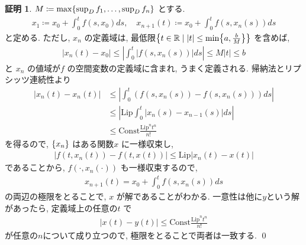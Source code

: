 \documentclass[10pt, fleqn, label-section=none]{bxjsarticle}
\theoremstyle{definition}
\newtheorem*{pf*}{証明}
\newcommand{\cbra}[1]{\mleft\{#1\mright\}}
\newcommand{\abs}[1]{\left|#1\right|}
\newcommand{\Const}{\textrm{Const}}
\renewcommand{\;}{\, ; \,}
\begin{document}
\begin{pf*} $M \coloneqq \max \cbra{ \sup_D f_1, \ldots , \sup_D f_n}$ とする.
\begin{align*} x_1 \coloneqq x_0 + \int_0^t f(s, x_0) ds , \quad x_{n+1} (t) \coloneqq x_0 + \int_0^t f(s, x_n (s) ) ds\end{align*}
と定める. ただし, $x_n$ の定義域は, 最低限$\cbra{ t \in \mathbb R \mid \abs{t} \leq \min \cbra{a, \frac{b}{M }} } $ を含めば, 
\begin{align*} \abs{x_n (t) - x_0}  \leq \abs{\int_0^t  \abs{f(s, x_n(s)) } ds } \leq M \abs t  \leq b \end{align*}
と
$x_n $ の値域が$f$ の空間変数の定義域に含まれ, うまく定義される.   帰納法とリプシッツ連続性より
\begin{align*} \abs{x_n(t) - x_n (t)} &\leq \abs{\int_0^t (f(s, x_n (s)) - f(s, x_n (s) ) )  ds} \\& \leq  \abs{ \textrm{Lip} \int_0^t \abs{x_n (s) - x_{n-1}(s) } ds } \\&\leq \Const \frac{\textrm{Lip} ^n t^n} {n!}   \end{align*}
を得るので, $\cbra{x_n}$ はある関数$x$ に一様収束し, 
\begin{align*} \abs{f(t, x_n (t)) - f(t,x(t))} \leq \textrm{Lip} \abs{x_n(t) - x(t)} \end{align*}
であることから, $f(\cdot, x_n(\cdot))$ も一様収束するので, 
\begin{align*}  x_{n+1} (t) = x_0 + \int_0^t f(s, x_n (s) ) ds \end{align*}
の両辺の極限をとることで, $x$ が解であることがわかる. 一意性は他に$y$という解があったら, 定義域上の任意の$t$ で
\begin{align*} \abs{x(t) -  y(t) } \leq \Const \frac{\textrm{Lip} ^n t^n} {n!}     \end{align*}
が任意の$n$について成り立つので, 極限をとることで両者は一致する.
\qed
\end{pf*}
\end{document}
